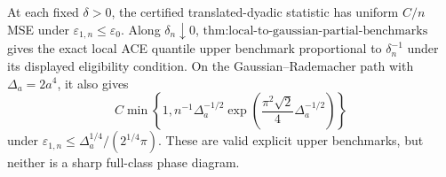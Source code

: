 At each fixed \(\delta>0\), the certified translated-dyadic statistic has uniform \(C/n\) MSE under \(\varepsilon_{1,n}\le\varepsilon_0\).  Along \(\delta_n\downarrow0\), \(\text{thm:local-to-gaussian-partial-benchmarks}\) gives the exact local ACE quantile upper benchmark proportional to \(\delta_n^{-1}\) under its displayed eligibility condition.  On the Gaussian--Rademacher path with \(\Delta_a=2a^4\), it also gives
\[
 C\min\!\left\{1,n^{-1}\Delta_a^{-1/2}
 \exp\!\left(\frac{\pi^2\sqrt2}{4}\Delta_a^{-1/2}\right)\right\}
\]
under \(\varepsilon_{1,n}\le\Delta_a^{1/4}/(2^{1/4}\pi)\).  These are valid explicit upper benchmarks, but neither is a sharp full-class phase diagram.